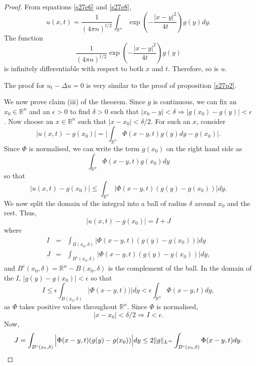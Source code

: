 \documentclass{article}
\DeclarePairedDelimiter\norm{\lVert}{\rVert}
\theoremstyle{plain}
\numberwithin{thm}{section}
\theoremstyle{plain}
\numberwithin{prop}{section}
\theoremstyle{definition}
\numberwithin{defn}{section}
\theoremstyle{remark}
\numberwithin{equation}{section}
\begin{document}
\begin{proof}
From equations \eqref{s27e6} and \eqref{s27e8},
\begin{equation}\label{s27e9}
u(x, t) = \frac{1}{(4\pi n)^{t/2}}\int_{\mathbb{R}^n} \exp\left(-\frac{|x - y|^2}{4t}\right)g(y)dy.
\end{equation}
The function
\[
\frac{1}{(4\pi n)^{t/2}}\exp\left(-\frac{|x - y|^2}{4t}\right)g(y)
\]
is infinitely differentiable with respect to both $x$ and $t$. Therefore, so is $u$.

The proof for $u_t - \Delta u = 0$ is very similar to the proof of proposition \ref{s27p2}.

We now prove claim (iii) of the theorem. Since $g$ is continuous, we can fix an $x_0 \in \mathbb{R}^n$ and an
$\epsilon > 0$ to find $\delta > 0$ such that $|x_0 - y| < \delta \Rightarrow |g(x_0) - g(y)| < \epsilon$. Now
choose an $x \in \mathbb{R}^n$ such that $|x - x_0| < \delta/2$. For such an $x$, consider
\begin{equation}\label{s27e10}
|u(x, t) - g(x_0)| = \Big|\int_{\mathbb{R}^n}\Phi(x - y, t)g(y)dy - g(x_0)\Big|.
\end{equation}
Since $\Phi$ is normalised, we can write the term $g(x_0)$ on the right hand side as
\[
\int_{\mathbb{R}^n}\Phi(x - y, t)g(x_0)dy
\]
so that
\[
|u(x, t) - g(x_0)| \le \int_{\mathbb{R}^n}\Big|\Phi(x - y, t)(g(y) - g(x_0))\Big|dy.
\]
We now split the domain of the integral into a ball of radius $\delta$ around $x_0$ and the rest. Thus,
\begin{equation}\label{s27e11}
|u(x, t) - g(x_0)| = I + J
\end{equation}
where
\begin{eqnarray*}
I &=& \int_{B(x_0, \delta)}\Big|\Phi(x - y, t)(g(y) - g(x_0))\Big|dy \\ 
J &=& \int_{B^c(x_0, \delta)}\Big|\Phi(x - y, t)(g(y) - g(x_0))\Big|dy,
\end{eqnarray*}
and $B^c(x_0, \delta) = \mathbb{R}^n - B(x_0, \delta)$ is the complement of the ball. In the domain of the $I$,
$|g(y) - g(x_0)| < \epsilon$ so that
\[
I \le \epsilon \int_{B(x_0, \delta)}\Big|\Phi(x - y, t))\Big|dy < \epsilon\int_{\mathbb{R}^n}\Phi(x - y, t)dy,
\]
as $\Phi$ takes positive values throughout $\mathbb{R}^n$. Since $\Phi$ is normalised,
\begin{equation}\label{s27e12}
|x - x_0| < \delta/2 \Rightarrow I < \epsilon.
\end{equation}
Now,
\[
J = \int_{B^c(x_0, \delta)}\Big|\Phi(x - y, t)(g(y) - g(x_0))\Big|dy \le
2\norm{g}_{L^\infty}\int_{B^c(x_0, \delta)} \Phi(x - y, t)dy.
\]
\end{proof}
\end{document}
